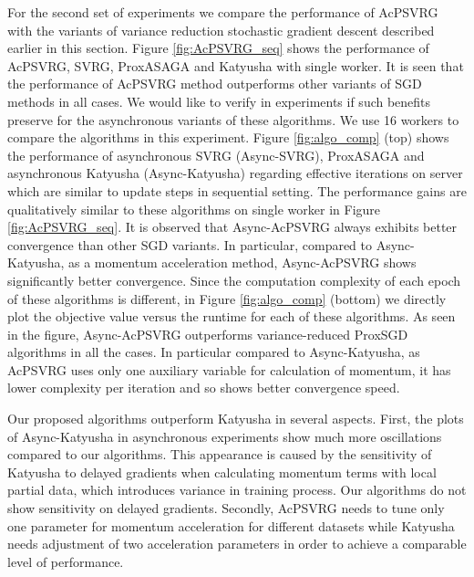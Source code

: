 For the second set of experiments we compare the performance of AcPSVRG with the variants of variance reduction stochastic gradient descent described earlier in this section.  
Figure \ref{fig:AcPSVRG_seq} shows the performance of AcPSVRG, SVRG, ProxASAGA and Katyusha with single worker. It is seen that the performance of AcPSVRG method outperforms other variants of SGD methods in all cases. We would like to verify in experiments if such benefits preserve for the asynchronous variants of these algorithms. We use 16 workers to compare the algorithms in this experiment. Figure \ref{fig:algo_comp} (top) shows the performance of asynchronous SVRG (Async-SVRG), ProxASAGA and asynchronous Katyusha (Async-Katyusha) regarding effective iterations on server which are similar to update steps in sequential setting. 
The performance gains are qualitatively similar to these algorithms on single worker in Figure \ref{fig:AcPSVRG_seq}. It is observed that Async-AcPSVRG always exhibits better convergence than other SGD variants. In particular, compared to Async-Katyusha, as a momentum acceleration method, Async-AcPSVRG shows significantly better convergence. Since the computation complexity of each epoch of these
algorithms is different, in Figure \ref{fig:algo_comp} (bottom) we directly plot the objective value versus the runtime for each of these algorithms. 
As seen in the figure, Async-AcPSVRG outperforms variance-reduced ProxSGD algorithms in all the cases. In particular compared to Async-Katyusha, as AcPSVRG uses only one auxiliary variable for calculation of momentum, it has lower complexity per iteration and so shows better convergence speed. 

Our proposed algorithms outperform Katyusha in several aspects. First, the plots of Async-Katyusha in asynchronous experiments show much more oscillations compared to our algorithms. This appearance
is caused by the sensitivity of Katyusha  to delayed gradients when calculating momentum terms with local partial data, which introduces variance in training process. Our algorithms do not show sensitivity on delayed gradients. Secondly, AcPSVRG needs to tune only one parameter for momentum acceleration for different datasets while Katyusha needs adjustment of two acceleration parameters in order to achieve a comparable level of performance.

